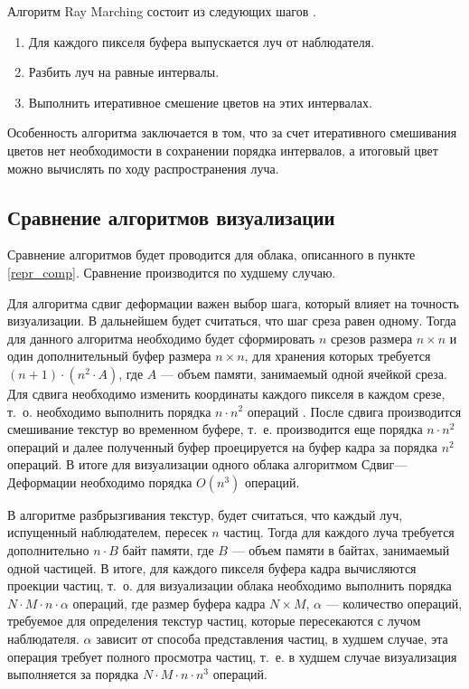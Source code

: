 Алгоритм Ray Marching состоит из следующих шагов \cite{hzd, frostbite, clouds}.
\begin{enumerate}
	\item Для каждого пикселя буфера выпускается луч от наблюдателя.
	\item Разбить луч на равные интервалы.
	\item Выполнить итеративное смешение цветов на этих интервалах.
\end{enumerate}

Особенность алгоритма заключается в том, что за счет итеративного смешивания цветов нет необходимости в сохранении порядка интервалов, а итоговый цвет можно вычислять по ходу распространения луча.

\subsection{Сравнение алгоритмов визуализации}

Сравнение алгоритмов будет проводится для облака, описанного в пункте \ref{repr_comp}. Сравнение производится по худшему случаю.

Для алгоритма сдвиг деформации важен выбор шага, который влияет на точность визуализации. В дальнейшем будет считаться, что шаг среза равен одному. Тогда для данного алгоритма необходимо будет сформировать $n$ срезов размера $n \times n$ и один дополнительный буфер размера $n \times n$, для хранения которых требуется $(n + 1)\cdot(n^2 \cdot A)$, где $A$ --- объем памяти, занимаемый одной ячейкой среза. Для сдвига необходимо изменить координаты каждого пикселя в каждом срезе, т.~о. необходимо выполнить порядка $n \cdot n^2$ операций \cite{shearwarp}. После сдвига производится смешивание текстур во временном буфере, т.~е. производится еще порядка $n \cdot n^2$ операций и далее полученный буфер проецируется на буфер кадра за порядка $n^2$ операций. В итоге для визуализации одного облака алгоритмом Сдвиг---Деформации необходимо порядка $O(n^3)$ операций.

В алгоритме разбрызгивания текстур, будет считаться, что каждый луч, испущенный наблюдателем, пересек $n$ частиц. Тогда для каждого луча требуется дополнительно $n\cdot B$ байт памяти, где $B$ --- объем памяти в байтах, занимаемый одной частицей. 
В итоге, для каждого пикселя буфера кадра вычисляются проекции частиц, т.~о. для визуализации облака необходимо выполнить порядка $N\cdot M \cdot n \cdot \alpha$ операций, где размер буфера кадра $N \times M$, $\alpha$ --- количество операций, требуемое для определения текстур частиц, которые пересекаются с лучом наблюдателя. $\alpha$ зависит от способа представления частиц, в худшем случае, эта операция требует полного просмотра частиц, т.~е. в худшем случае визуализация выполняется за порядка $N\cdot M \cdot n \cdot n^3$ операций. 


